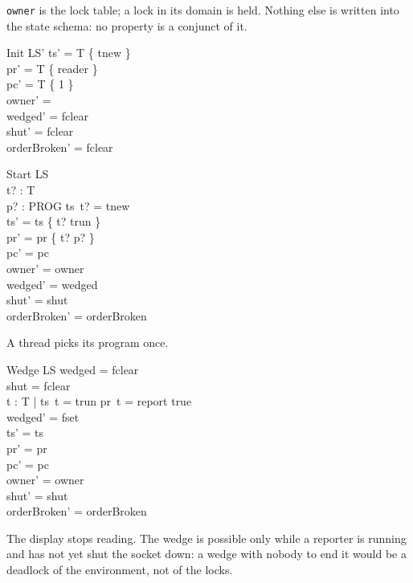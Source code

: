 \documentclass[a4paper,10pt,fleqn]{article}
\begin{document}
\texttt{owner} is the lock table; a lock in its domain is held.  Nothing else
is written into the state schema: no property is a conjunct of it.

\begin{schema}{Init}
  LS'
\where
  ts' = T \cross \{ tnew \} \\
  pr' = T \cross \{ reader \} \\
  pc' = T \cross \{ 1 \} \\
  owner' = \emptyset \\
  wedged' = fclear \\
  shut' = fclear \\
  orderBroken' = fclear
\end{schema}

\begin{schema}{Start}
  \Delta LS \\
  t? : T \\
  p? : PROG
\where
  ts~t? = tnew \\
  ts' = ts \oplus \{ t? \mapsto trun \} \\
  pr' = pr \oplus \{ t? \mapsto p? \} \\
  pc' = pc \\
  owner' = owner \\
  wedged' = wedged \\
  shut' = shut \\
  orderBroken' = orderBroken
\end{schema}

A thread picks its program once.

\begin{schema}{Wedge}
  \Delta LS
\where
  wedged = fclear \\
  shut = fclear \\
  \exists t : T | ts~t = trun \land pr~t = report \spot true \\
  wedged' = fset \\
  ts' = ts \\
  pr' = pr \\
  pc' = pc \\
  owner' = owner \\
  shut' = shut \\
  orderBroken' = orderBroken
\end{schema}

The display stops reading.  The wedge is possible only while a reporter is
running and has not yet shut the socket down: a wedge with nobody to end it
would be a deadlock of the environment, not of the locks.
\end{document}

